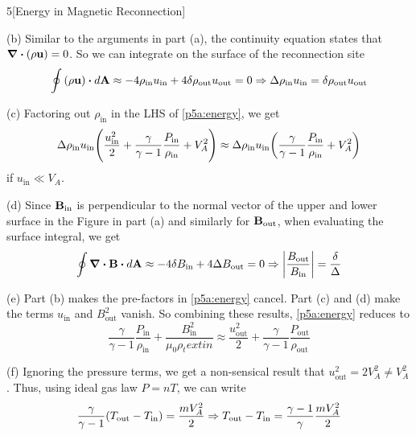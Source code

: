 \documentclass[12pt]{article}
\begin{document}
\begin{problem}{5}[Energy in Magnetic Reconnection]
\begin{solution}
(b) Similar to the arguments in part (a), the continuity equation states that
$\div{\qty(\rho\vb{u})}=0$. So we can integrate on the surface of the
reconnection site
\begin{equation}
    \oint\qty(\rho\vb{u})\vdot d\vb{A}
    \approx-4\rho_\text{in}u_\text{in}+4\delta\rho_\text{out}u_\text{out}
    =0\Rightarrow\Delta\rho_\text{in}u_\text{in}=\delta\rho_\text{out}u_\text{out}
\end{equation}

(c) Factoring out $\rho_\text{in}$ in the LHS of \eqref{p5a:energy}, we get
\begin{equation}
    \Delta\rho_\text{in}u_\text{in}\qty(\frac{u_\text{in}^2}{2}+\frac{\gamma}{\gamma-1}\frac{P_\text{in}}{\rho_\text{in}}+V_A^2)
    \approx
    \Delta\rho_\text{in}u_\text{in}\qty(\frac{\gamma}{\gamma-1}\frac{P_\text{in}}{\rho_\text{in}}+V_A^2)
\end{equation}
if $u_\text{in}\ll V_A$.

(d) Since $\vb{B}_\text{in}$ is perpendicular to the normal vector of the upper
and lower surface in the Figure in part (a) and similarly for
$\vb{B}_\text{out}$, when evaluating the surface integral, we get
\begin{equation}
    \oint\div{\vb{B}}\vdot d\vb{A}\approx-4\delta B_\text{in}+4\Delta B_\text{out}=0 
    \Rightarrow\abs{\frac{B_\text{out}}{B_\text{in}}}=\frac\delta\Delta
\end{equation}

(e) Part (b) makes the pre-factors in \eqref{p5a:energy} cancel. Part
(c) and (d) make the terms $u_\text{in}$ and $B_\text{out}^2$ vanish.
So combining these results, \eqref{p5a:energy} reduces to
\begin{equation}
    \frac{\gamma}{\gamma-1}\frac{P_\text{in}}{\rho_\text{in}}
    +\frac{B_\text{in}^2}{\mu_0\rho_text{in}}\approx\frac{u_\text{out}^2}{2}+\frac{\gamma}{\gamma-1}\frac{P_\text{out}}{\rho_\text{out}}
\end{equation}

(f) Ignoring the pressure terms, we get a non-sensical result that
$u_\text{out}^2=2V_A^2\neq V_A^2$. Thus, using ideal gas law $P=nT$, we can
write
\begin{equation}
    \frac{\gamma}{\gamma-1}\qty(T_\text{out}-T_\text{in})=\frac{mV_A^2}2 
    \Rightarrow T_\text{out}-T_\text{in}=\frac{\gamma-1}{\gamma}\frac{mV_A^2}{2}
\end{equation}
\end{solution}
\end{problem}
\end{document}
